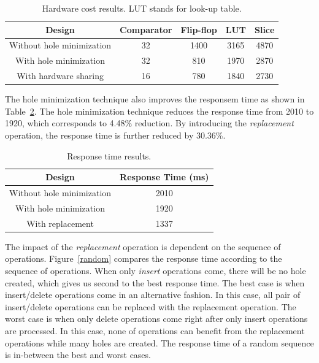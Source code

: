 \documentclass[10pt, conference, compsocconf]{IEEEtran}
\begin{document}
\begin{table}
 \begin{center}
 \caption{Hardware cost results. LUT stands for look-up table.}
\label{table2}
\begin{tabular}{|c|c|c|c|c|}
 \hline
 Design  & Comparator  & Flip-flop & LUT &Slice \\
 \hline
 \hline
Without hole minimization & 32 & 1400 & 3165 & 4870 \\
 \hline
With hole minimization & 32 & 810 & 1970 & 2870 \\
  \hline
With hardware sharing & 16 & 780 & 1840 & 2730 \\
\hline
\end{tabular}
\end{center}
\end{table}

The hole minimization technique also improves the responsem time as shown in Table~\ref{table3}.
The hole minimization technique reduces the response time from 2010 to 1920, which corresponds to 4.48\% reduction.
By introducing the {\it replacement} operation, the response time is further reduced by 30.36\%.

\begin{table}
 \begin{center}
 \caption{Response time results.}
\label{table3}
\begin{tabular}{ |c|c|}
 \hline
 Design  &  Response Time (ms) \\
 \hline
Without hole minimization & 2010 \\
  \hline
With hole minimization & 1920 \\
  \hline
With replacement & 1337 \\
  \hline
\end{tabular}
\end{center}
\end{table}

The impact of the {\it replacement} operation is dependent on the sequence of operations.
Figure~\ref{random} compares the response time according to the sequence of operations.
When only {\it insert} operations come, there will be no hole created, which gives us second to the best response time.
The best case is when insert/delete operations come in an alternative fashion.
In this case, all pair of insert/delete operations can be replaced with the replacement operation.
The worst case is when only delete operations come right after only insert operations are processed.
In this case, none of operations can benefit from the replacement operations while many holes are created.
The response time of a random sequence is in-between the best and worst cases.
\end{document}

